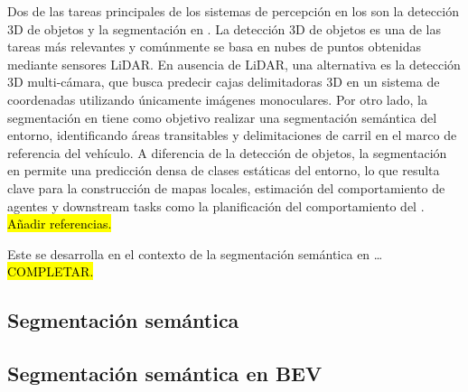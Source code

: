 Dos de las tareas principales de los sistemas de percepción en los  son la detección 3D de objetos y la segmentación en . La detección 3D de objetos es una de las tareas más relevantes y comúnmente se basa en nubes de puntos obtenidas mediante sensores LiDAR. En ausencia de LiDAR, una alternativa es la detección 3D multi-cámara, que busca predecir cajas delimitadoras 3D en un sistema de coordenadas  utilizando únicamente imágenes monoculares. Por otro lado, la segmentación en  tiene como objetivo realizar una segmentación semántica del entorno, identificando áreas transitables y delimitaciones de carril en el marco de referencia del vehículo. A diferencia de la detección de objetos, la segmentación en  permite una predicción densa de clases estáticas del entorno, lo que resulta clave para la construcción de mapas locales, estimación del comportamiento de agentes y downstream tasks como la planificación del comportamiento del . \hl{Añadir referencias.}

Este  se desarrolla en el contexto de la segmentación semántica en \dots \hl{COMPLETAR.}


\subsection{Segmentación semántica}
\lipsum[2-4]

\subsection{Segmentación semántica en BEV}
\lipsum[1-1]


